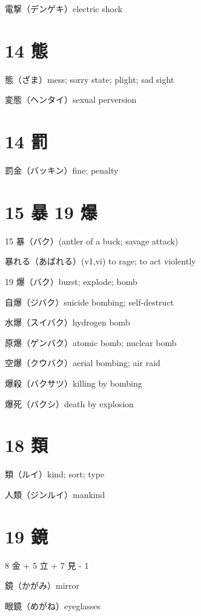 電撃（デンゲキ）electric shock

\section{14 態}

態（ざま）mess; sorry state; plight; sad sight

変態（ヘンタイ）sexual perversion

\section{14 罰}

罰金（バッキン）fine; penalty

\section{15 暴 19 爆}

15 暴（バク）(antler of a buck; savage attack)

暴れる（あばれる）(v1,vi) to rage; to act violently

19 爆（バク）burst; explode; bomb

自爆（ジバク）suicide bombing; self-destruct

水爆（スイバク）hydrogen bomb

原爆（ゲンバク）atomic bomb; nuclear bomb

空爆（クウバク）aerial bombing; air raid

爆殺（バクサツ）killing by bombing

爆死（バクシ）death by explosion

\section{18 類}

類（ルイ）kind; sort; type

人類（ジンルイ）mankind

\section{19 鏡}

8 金 + 5 立 + 7 見 - 1

鏡（かがみ）mirror

眼鏡（めがね）eyeglasses
